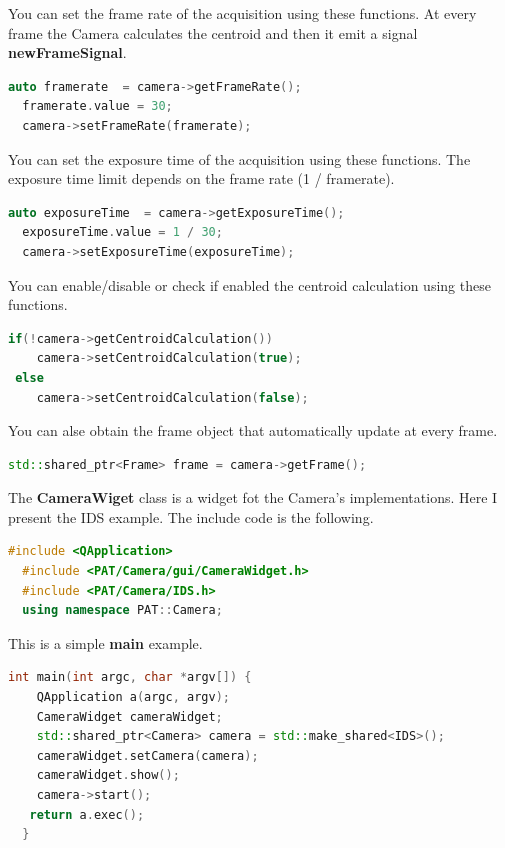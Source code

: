 You can set the frame rate of the acquisition using these functions. At
every frame the Camera calculates the centroid and then it emit a signal
\textbf{newFrameSignal}.

\begin{lstlisting}[language=c++, gobble=2]
  auto framerate  = camera->getFrameRate();
  framerate.value = 30;
  camera->setFrameRate(framerate);
\end{lstlisting}

You can set the exposure time of the acquisition using these functions.
The exposure time limit depends on the frame rate (1 / framerate).

\begin{lstlisting}[language=c++, gobble=2]
  auto exposureTime  = camera->getExposureTime();
  exposureTime.value = 1 / 30;
  camera->setExposureTime(exposureTime);
\end{lstlisting}

You can enable/disable or check if enabled the centroid calculation
using these functions.

\begin{lstlisting}[language=c++, gobble=2]
  if(!camera->getCentroidCalculation())
    camera->setCentroidCalculation(true);
 else
    camera->setCentroidCalculation(false);
\end{lstlisting}

You can alse obtain the frame object that automatically update at
every frame.

\begin{lstlisting}[language=c++, gobble=2]
  std::shared_ptr<Frame> frame = camera->getFrame();
\end{lstlisting}


The \textbf{CameraWiget} class is a widget fot the Camera's
implementations. Here I present the IDS example. The include code is the
following.

\begin{lstlisting}[language=c++, gobble=2]
  #include <QApplication>
  #include <PAT/Camera/gui/CameraWidget.h>
  #include <PAT/Camera/IDS.h>
  using namespace PAT::Camera;
\end{lstlisting}

This is a simple \textbf{main} example.

\begin{lstlisting}[language=c++, gobble=2]
  int main(int argc, char *argv[]) {
    QApplication a(argc, argv);
    CameraWidget cameraWidget;
    std::shared_ptr<Camera> camera = std::make_shared<IDS>();
    cameraWidget.setCamera(camera);
    cameraWidget.show();
    camera->start();
   return a.exec();
  }
\end{lstlisting}

